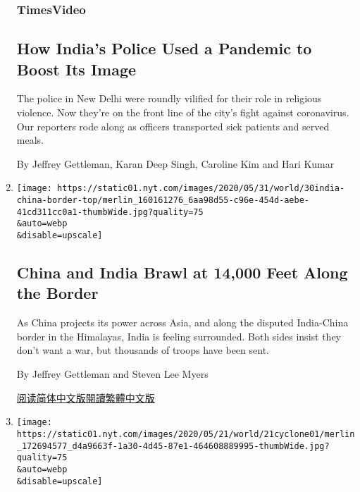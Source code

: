 \begin{enumerate}
  \hypertarget{timesvideo}{%
  \subsubsection{TimesVideo}\label{timesvideo}}

  \hypertarget{how-indias-police-used-a-pandemic-to-boost-its-image}{%
  \subsection{How India's Police Used a Pandemic to Boost Its
  Image}\label{how-indias-police-used-a-pandemic-to-boost-its-image}}

  The police in New Delhi were roundly vilified for their role in
  religious violence. Now they're on the front line of the city's fight
  against coronavirus. Our reporters rode along as officers transported
  sick patients and served meals.

  By Jeffrey Gettleman, Karan Deep Singh, Caroline Kim and Hari Kumar
\item
  \href{/2020/05/30/world/asia/india-china-border.html}{}

  \texttt{[image: https://static01.nyt.com/images/2020/05/31/world/30india-china-border-top/merlin\_160161276\_6aa98d55-c96e-454d-aebe-41cd311cc0a1-thumbWide.jpg?quality=75\\\&auto=webp\\\&disable=upscale]}

  \hypertarget{china-and-india-brawl-at-14000-feet-along-the-border}{%
  \subsection{China and India Brawl at 14,000 Feet Along the
  Border}\label{china-and-india-brawl-at-14000-feet-along-the-border}}

  As China projects its power across Asia, and along the disputed
  India-China border in the Himalayas, India is feeling surrounded. Both
  sides insist they don't want a war, but thousands of troops have been
  sent.

  By Jeffrey Gettleman and Steven Lee Myers

  \href{https://cn.nytimes.com/world/20200603/india-china-border/}{阅读简体中文版}\href{https://cn.nytimes.com/world/20200603/india-china-border/zh-hant}{閱讀繁體中文版}
\item
  \href{/2020/05/21/world/asia/cyclone-amphan-india-bangladesh.html}{}

  \texttt{[image: https://static01.nyt.com/images/2020/05/21/world/21cyclone01/merlin\_172694577\_d4a9663f-1a30-4d45-87e1-464608889995-thumbWide.jpg?quality=75\\\&auto=webp\\\&disable=upscale]}


\end{enumerate}
